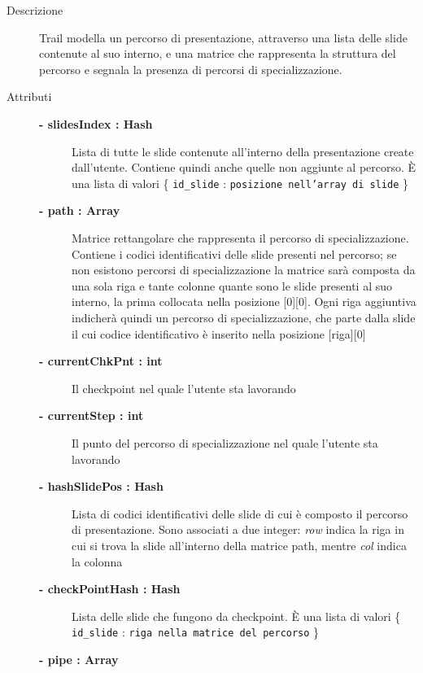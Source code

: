 \begin{description}
\item[Descrizione] \hfill
	Trail modella un percorso di presentazione, attraverso una lista delle slide contenute al suo interno, e una matrice che rappresenta la struttura del percorso e segnala la presenza di percorsi di specializzazione.
	
	

	
	
\item[Attributi] \hfill
	\begin{description}
		\item[\textbf{- slidesIndex : Hash			}] \hfill
			Lista di tutte le slide contenute all'interno della presentazione create dall'utente. Contiene quindi anche quelle non aggiunte al percorso. È una lista di valori \{ \texttt{id\_{}slide} : \texttt{posizione nell'array di slide} \}
		\item[\textbf{- path : Array			}] \hfill
			Matrice rettangolare che rappresenta il percorso di specializzazione. Contiene i codici identificativi delle slide presenti nel percorso; se non esistono percorsi di specializzazione la matrice sarà composta da una sola riga e tante colonne quante sono le slide presenti al suo interno, la prima collocata nella posizione [0][0]. Ogni riga aggiuntiva indicherà quindi un percorso di specializzazione, che parte dalla slide il cui codice identificativo è inserito nella posizione [riga][0]
			\item[\textbf{- currentChkPnt : int			}] \hfill
			Il checkpoint nel quale l'utente sta lavorando
			\item[\textbf{- currentStep : int			}] \hfill
			Il punto del percorso di specializzazione nel quale l'utente sta lavorando
			\item[\textbf{- hashSlidePos : Hash			}] \hfill
			Lista di codici identificativi delle slide di cui è composto il percorso di presentazione. Sono associati a due integer: \textit{row} indica la riga in cui si trova la slide all'interno della matrice path, mentre \textit{col} indica la colonna
			\item[\textbf{- checkPointHash : Hash		}] \hfill
			Lista delle slide che fungono da checkpoint. È una lista di valori  \{ \texttt{id\_{}slide} : \texttt{riga nella matrice del percorso} \}
			\item[\textbf{- pipe : Array		}] \hfill
	\end{description}
	

\end{description}
